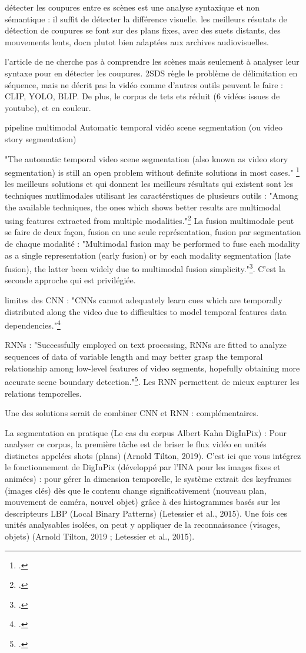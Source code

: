 détecter les coupures entre es scènes est une analyse syntaxique et non sémantique : il suffit de détecter la différence visuelle. les meilleurs résutats de détection de coupures se font sur des plans fixes, avec des suets distants, des mouvements lents, docn plutot bien adaptées aux archives audiovisuelles. 

l'article de \cite{xin2023} ne cherche pas à comprendre les scènes mais seulement à analyser leur syntaxe pour en détecter les coupures. 2SDS règle le problème de délimitation en séquence, mais ne décrit pas la vidéo comme d'autres outils peuvent le faire : CLIP, YOLO, BLIP. De plus, le corpus de tets ets réduit (6 vidéos issues de youtube), et en couleur. 


 pipeline multimodal 
Automatic temporal vidéo scene segmentation (ou video story segmentation)

"The automatic temporal video scene segmentation (also known as video story segmentation) is still an open problem without definite solutions in most cases." \footcite{trojahn2021}
les meilleurs solutions et qui donnent les meilleurs résultats qui existent sont les techniques mutlimodales utilisant les caractérstiques de plusieurs outils : "Among the available techniques, the ones which shows better results are multimodal using features extracted from multiple modalities."\footcite{trojahn2021}
La fusion multimodale peut se faire de deux façon, fusion en une seule représentation, fusion par segmentation de chaque modalité : "Multimodal fusion may be performed to fuse each modality as a single representation (early fusion) or by each modality segmentation (late fusion), the latter been widely due to multimodal fusion simplicity."\footcite{trojahn2021}. C'est la seconde approche qui est privilégiée. 

limites des CNN : "CNNs cannot adequately learn cues which are temporally distributed along the video due to difficulties to model temporal features data dependencies."\footcite{trojahn2021}

RNNs : "Successfully employed on text processing, RNNs are fitted to analyze sequences of data of variable length and may better grasp the temporal relationship among low-level features of video segments, hopefully obtaining more accurate scene boundary detection."\footcite{trojahn2021}. Les RNN permettent de mieux capturer les relations temporelles. 

Une des solutions serait de combiner CNN et RNN : complémentaires.

La segmentation en pratique (Le cas du corpus Albert Kahn  DigInPix) : Pour analyser ce corpus, la première tâche est de briser le flux vidéo en unités distinctes appelées shots (plans) (Arnold  Tilton, 2019). C'est ici que vous intégrez le fonctionnement de DigInPix (développé par l'INA pour les images fixes et animées) : pour gérer la dimension temporelle, le système extrait des keyframes (images clés) dès que le contenu change significativement (nouveau plan, mouvement de caméra, nouvel objet) grâce à des histogrammes basés sur les descripteurs LBP (Local Binary Patterns) (Letessier et al., 2015). Une fois ces unités analysables isolées, on peut y appliquer de la reconnaissance (visages, objets) (Arnold  Tilton, 2019 ; Letessier et al., 2015).

